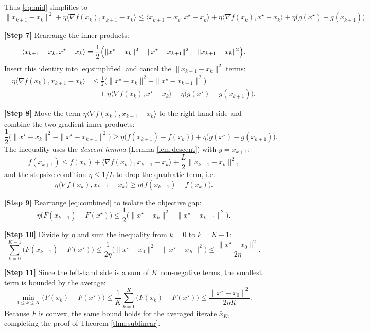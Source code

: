\documentclass{article}
\newcommand{\grad}{\nabla}
\begin{document}
Thus \eqref{eq:mid} simplifies to
\begin{equation}
\label{eq:simplified}
\|x_{k+1}-x_{k}\|^{2}
+\eta\langle\grad f(x_{k}),x_{k+1}-x_{k}\rangle
\le \langle x_{k+1}-x_{k},x^{\star}-x_{k}\rangle
+\eta\langle \grad f(x_{k}),x^{\star}-x_{k}\rangle
+\eta\bigl(g(x^{\star})-g(x_{k+1})\bigr).
\end{equation}

\noindent\textbf{[Step 7]} Rearrange the inner products:
\[
\langle x_{k+1}-x_{k},x^{\star}-x_{k}\rangle
= \frac12\Bigl(\|x^{\star}-x_{k}\|^{2}-\|x^{\star}-x_{k+1}\|^{2}-\|x_{k+1}-x_{k}\|^{2}\Bigr).
\]
Insert this identity into \eqref{eq:simplified} and cancel the $\|x_{k+1}-x_{k}\|^{2}$ terms:
\begin{align}
\eta\langle\grad f(x_{k}),x_{k+1}-x_{k}\rangle
&\le \frac12\bigl(\|x^{\star}-x_{k}\|^{2}-\|x^{\star}-x_{k+1}\|^{2}\bigr) \nonumber\\
&\quad +\eta\langle \grad f(x_{k}),x^{\star}-x_{k}\rangle
+\eta\bigl(g(x^{\star})-g(x_{k+1})\bigr). \label{eq:after_id}
\end{align}

\noindent\textbf{[Step 8]} Move the term $\eta\langle\grad f(x_{k}),x_{k+1}-x_{k}\rangle$ to the right‑hand side and combine the two gradient inner products:
\begin{equation}
\label{eq:combined}
\frac12\bigl(\|x^{\star}-x_{k}\|^{2}-\|x^{\star}-x_{k+1}\|^{2}\bigr)
\ge \eta\bigl(f(x_{k+1})-f(x_{k})\bigr)
+\eta\bigl(g(x^{\star})-g(x_{k+1})\bigr).
\end{equation}
The inequality uses the \emph{descent lemma} (Lemma \ref{lem:descent}) with $y=x_{k+1}$:
\[
f(x_{k+1})\le f(x_{k})+\langle\grad f(x_{k}),x_{k+1}-x_{k}\rangle+\frac{L}{2}\|x_{k+1}-x_{k}\|^{2},
\]
and the stepsize condition $\eta\le 1/L$ to drop the quadratic term, i.e.
\[
\eta\langle\grad f(x_{k}),x_{k+1}-x_{k}\rangle\ge \eta\bigl(f(x_{k+1})-f(x_{k})\bigr).
\]

\noindent\textbf{[Step 9]} Rearrange \eqref{eq:combined} to isolate the objective gap:
\[
\eta\bigl(F(x_{k+1})-F(x^{\star})\bigr)
\le \frac12\bigl(\|x^{\star}-x_{k}\|^{2}-\|x^{\star}-x_{k+1}\|^{2}\bigr).
\]

\noindent\textbf{[Step 10]} Divide by $\eta$ and sum the inequality from $k=0$ to $k=K-1$:
\[
\sum_{k=0}^{K-1}\bigl(F(x_{k+1})-F(x^{\star})\bigr)
\le \frac{1}{2\eta}\bigl(\|x^{\star}-x_{0}\|^{2}-\|x^{\star}-x_{K}\|^{2}\bigr)
\le \frac{\|x^{\star}-x_{0}\|^{2}}{2\eta}.
\]

\noindent\textbf{[Step 11]} Since the left‑hand side is a sum of $K$ non‑negative terms, the smallest term is bounded by the average:
\[
\min_{1\le k\le K}\bigl(F(x_{k})-F(x^{\star})\bigr)
\le \frac1K\sum_{k=1}^{K}\bigl(F(x_{k})-F(x^{\star})\bigr)
\le \frac{\|x^{\star}-x_{0}\|^{2}}{2\eta K}.
\]
Because $F$ is convex, the same bound holds for the averaged iterate $\bar x_{K}$, completing the proof of Theorem \ref{thm:sublinear}.
\end{document}

